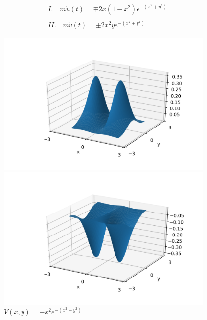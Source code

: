 \documentclass[a4paper,12pt]{article}
\begin{document}
\begin{align*}
	I. \quad m\dot{u}(t) = \mp 2x(1-x^{2})e^{-(x^{2}+y^{2})} \\ \\
	II. \quad m\dot{v}(t) = \pm 2x^{2}ye^{-(x^{2}+y^{2})}
\end{align*}

\begin{figure}[H]
	\centering
	\begin{minipage}{0.5\textwidth}
		\centering
		\includegraphics[width=0.96\textwidth]{./two_peaks.png}
		\caption{ $V(x,y) = x^{2}e^{-(x^{2}+y^{2})}$ }
	\end{minipage}\hfill
	\begin{minipage}{0.5\textwidth}
		\centering
		\includegraphics[width=0.96\textwidth]{./two_peaks2.png}
		\caption{ $V(x,y) = -x^{2}e^{-(x^{2}+y^{2})}$ }
	\end{minipage}\hfill
\end{figure}
\end{document}
